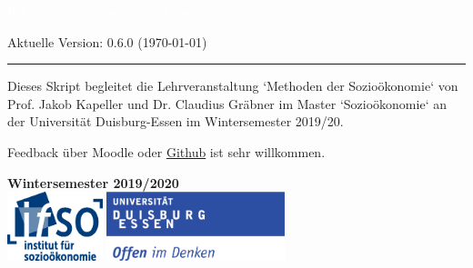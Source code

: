 \onehalfspacing
{}

\begin{titlepage}
\BgThispage
{}
\vspace*{2cm}
\noindent
\textcolor{white}{\bigsf R für die \mbox{sozioökonomische} Forschung}
\vspace*{1.0cm}\par
Aktuelle Version: 0.6.0 (\today)\\
\vspace*{2.0cm}\par
\noindent
\begin{minipage}{0.35\linewidth}
    \begin{flushright}
        \printauthor
    \end{flushright}
\end{minipage} \hspace{15pt}
%
\begin{minipage}{0.02\linewidth}
    \rule{1pt}{175pt}
\end{minipage} \hspace{-10pt}
%
\begin{minipage}{0.6\linewidth}
\vspace{5pt}
\begin{adjustwidth}{25pt}{25pt}
\raggedright
Dieses Skript begleitet die Lehrveranstaltung `Methoden der Sozioökonomie` von
Prof. Jakob Kapeller und Dr. Claudius Gräbner im Master `Sozioökonomie` an der
Universität Duisburg-Essen im Wintersemester 2019/20.

Feedback über Moodle oder
\href{https://github.com/graebnerc/RforSocioEcon}{Github} ist
sehr willkommen.
\end{adjustwidth}

\end{minipage}

\vspace{0.25cm}
\centering
\vspace{1.25cm}
\textbf{Wintersemester 2019/2020}\\
\vfill
\includegraphics[height=2cm]{figures/ifso_logo_dt_RGB} \hspace{2cm}
\includegraphics[height=2cm]{figures/logo_ude.pdf}
\end{titlepage}

\newpage
{}

